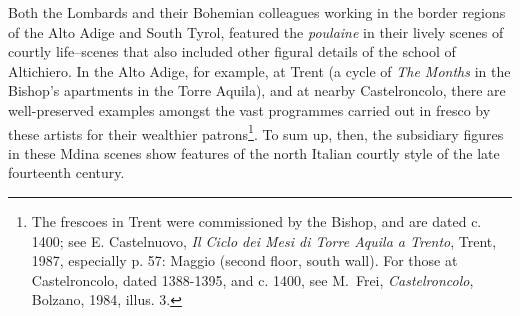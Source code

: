 \documentclass[a4paper,12pt]{article}
\begin{document}
Both the Lombards and their Bohemian
colleagues working in the border regions of the Alto Adige and South
Tyrol, featured the \textit{poulaine} in their lively scenes of
courtly life--scenes that also included other figural details of the
school of Altichiero.  In the Alto Adige, for example, at Trent (a
cycle of \textit{The Months} in the Bishop's apartments in the Torre
Aquila), and at nearby Castelroncolo, there are well-preserved
examples amongst the vast programmes carried out in fresco by these
artists for their wealthier patrons\footnote{The frescoes in Trent
were commissioned by the Bishop, and are dated c. 1400; see
E. Castelnuovo, \textit{Il Ciclo dei Mesi di Torre Aquila a Trento},
Trent, 1987, especially p. 57: Maggio (second floor, south wall).  For
those at Castelroncolo, dated 1388-1395, and c. 1400, see M.~Frei,
\textit{Castelroncolo}, Bolzano, 1984, illus. 3.}. To sum up, then,
the subsidiary figures in these Mdina scenes show features of the
north Italian courtly style of the late fourteenth century.
\end{document}
